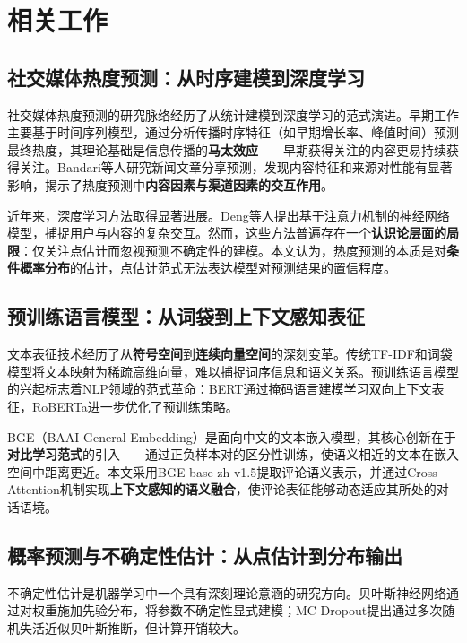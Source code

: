 \documentclass[10pt]{article}
\begin{document}
\section{相关工作}

\subsection{社交媒体热度预测：从时序建模到深度学习}

社交媒体热度预测的研究脉络经历了从统计建模到深度学习的范式演进。早期工作主要基于时间序列模型\cite{yang2011patterns}，通过分析传播时序特征（如早期增长率、峰值时间）预测最终热度，其理论基础是信息传播的\textbf{马太效应}——早期获得关注的内容更易持续获得关注。Bandari等人\cite{bandari2012pulse}研究新闻文章分享预测，发现内容特征和来源对性能有显著影响，揭示了热度预测中\textbf{内容因素与渠道因素的交互作用}。

近年来，深度学习方法取得显著进展。Deng等人\cite{deng2020deep}提出基于注意力机制的神经网络模型，捕捉用户与内容的复杂交互。然而，这些方法普遍存在一个\textbf{认识论层面的局限}：仅关注点估计而忽视预测不确定性的建模。本文认为，热度预测的本质是对\textbf{条件概率分布}的估计，点估计范式无法表达模型对预测结果的置信程度。

\subsection{预训练语言模型：从词袋到上下文感知表征}

文本表征技术经历了从\textbf{符号空间}到\textbf{连续向量空间}的深刻变革。传统TF-IDF和词袋模型将文本映射为稀疏高维向量，难以捕捉词序信息和语义关系。预训练语言模型的兴起标志着NLP领域的范式革命：BERT\cite{devlin2019bert}通过掩码语言建模学习双向上下文表征，RoBERTa\cite{liu2019roberta}进一步优化了预训练策略。

BGE（BAAI General Embedding）\cite{bge2023}是面向中文的文本嵌入模型，其核心创新在于\textbf{对比学习范式}的引入——通过正负样本对的区分性训练，使语义相近的文本在嵌入空间中距离更近。本文采用BGE-base-zh-v1.5提取评论语义表示，并通过Cross-Attention机制实现\textbf{上下文感知的语义融合}，使评论表征能够动态适应其所处的对话语境。

\subsection{概率预测与不确定性估计：从点估计到分布输出}

不确定性估计是机器学习中一个具有深刻理论意涵的研究方向\cite{gal2016uncertainty}。贝叶斯神经网络\cite{blundell2015weight}通过对权重施加先验分布，将参数不确定性显式建模；MC Dropout\cite{gal2016dropout}提出通过多次随机失活近似贝叶斯推断，但计算开销较大。
\end{document}
